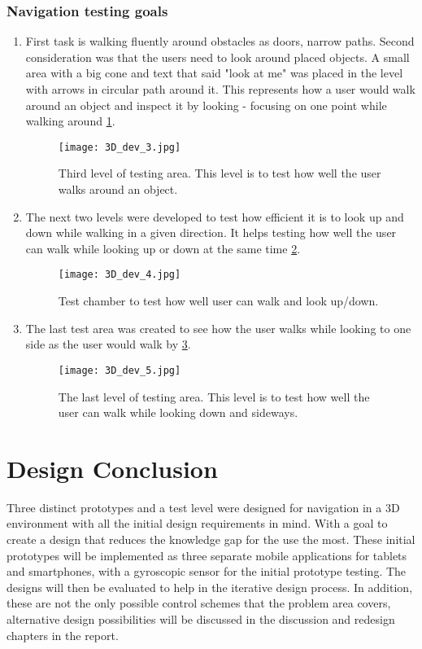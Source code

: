 \subsubsection{Navigation testing goals}
\begin {enumerate}
\item First task is walking fluently around obstacles as doors, narrow paths. Second consideration was that the users need to look around placed objects. A small area with a big cone and text that said "look at me" was placed in the level with arrows in circular path around it. This represents how a user would walk around an object and inspect it by looking - focusing on one point while walking around \ref{TestLevel3}.

\begin{figure}[H]
\centering
\texttt{[image: 3D\_dev\_3.jpg]}
\caption{Third level of testing area. This level is to test how well the user walks around an object.}
\label{TestLevel3}
\end{figure}

\item The next two levels were developed to test how efficient it is to look up and down while walking in a given direction. It helps testing how well the user can walk while looking up or down at the same time \ref{TestLevel4}.

\begin{figure}[H]
\centering
\texttt{[image: 3D\_dev\_4.jpg]}
\caption{Test chamber to test how well user can walk and look up/down.}
\label{TestLevel4}
\end{figure}

\item The last test area was created to see how the user walks while looking to one side as the user would walk by \ref{TestLevel5}.

\begin{figure}[H]
\centering
\texttt{[image: 3D\_dev\_5.jpg]}
\caption{The last level of testing area. This level is to test how well the user can walk while looking down and sideways.}
\label{TestLevel5}
\end{figure}
\end{enumerate} 

\section{Design Conclusion}
Three distinct prototypes and a test level were designed for navigation in a 3D environment with all the initial design requirements in mind. With a goal to create a design that reduces the knowledge gap for the use the most. These initial prototypes will be implemented as three separate mobile applications for tablets and smartphones, with a gyroscopic sensor for the initial prototype testing. The designs will then be evaluated to help in the iterative design process.
In addition, these are not the only possible control schemes that the problem area covers, alternative design possibilities will be discussed in the discussion and redesign chapters in the report. 